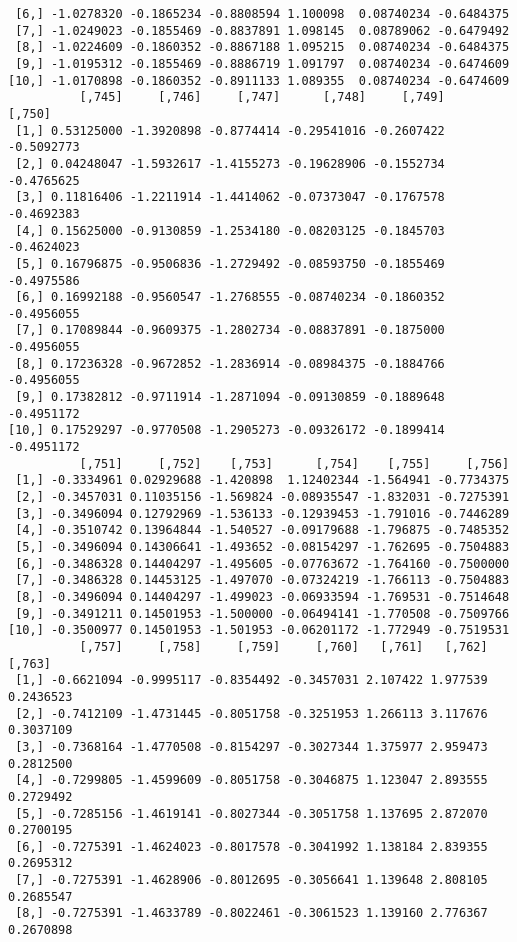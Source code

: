 \documentclass[
  letterpaper,
  DIV=11,
  numbers=noendperiod]{scrreprt}
\begin{document}
\begin{verbatim}
 [6,] -1.0278320 -0.1865234 -0.8808594 1.100098  0.08740234 -0.6484375
 [7,] -1.0249023 -0.1855469 -0.8837891 1.098145  0.08789062 -0.6479492
 [8,] -1.0224609 -0.1860352 -0.8867188 1.095215  0.08740234 -0.6484375
 [9,] -1.0195312 -0.1855469 -0.8886719 1.091797  0.08740234 -0.6474609
[10,] -1.0170898 -0.1860352 -0.8911133 1.089355  0.08740234 -0.6474609
          [,745]     [,746]     [,747]      [,748]     [,749]     [,750]
 [1,] 0.53125000 -1.3920898 -0.8774414 -0.29541016 -0.2607422 -0.5092773
 [2,] 0.04248047 -1.5932617 -1.4155273 -0.19628906 -0.1552734 -0.4765625
 [3,] 0.11816406 -1.2211914 -1.4414062 -0.07373047 -0.1767578 -0.4692383
 [4,] 0.15625000 -0.9130859 -1.2534180 -0.08203125 -0.1845703 -0.4624023
 [5,] 0.16796875 -0.9506836 -1.2729492 -0.08593750 -0.1855469 -0.4975586
 [6,] 0.16992188 -0.9560547 -1.2768555 -0.08740234 -0.1860352 -0.4956055
 [7,] 0.17089844 -0.9609375 -1.2802734 -0.08837891 -0.1875000 -0.4956055
 [8,] 0.17236328 -0.9672852 -1.2836914 -0.08984375 -0.1884766 -0.4956055
 [9,] 0.17382812 -0.9711914 -1.2871094 -0.09130859 -0.1889648 -0.4951172
[10,] 0.17529297 -0.9770508 -1.2905273 -0.09326172 -0.1899414 -0.4951172
          [,751]     [,752]    [,753]      [,754]    [,755]     [,756]
 [1,] -0.3334961 0.02929688 -1.420898  1.12402344 -1.564941 -0.7734375
 [2,] -0.3457031 0.11035156 -1.569824 -0.08935547 -1.832031 -0.7275391
 [3,] -0.3496094 0.12792969 -1.536133 -0.12939453 -1.791016 -0.7446289
 [4,] -0.3510742 0.13964844 -1.540527 -0.09179688 -1.796875 -0.7485352
 [5,] -0.3496094 0.14306641 -1.493652 -0.08154297 -1.762695 -0.7504883
 [6,] -0.3486328 0.14404297 -1.495605 -0.07763672 -1.764160 -0.7500000
 [7,] -0.3486328 0.14453125 -1.497070 -0.07324219 -1.766113 -0.7504883
 [8,] -0.3496094 0.14404297 -1.499023 -0.06933594 -1.769531 -0.7514648
 [9,] -0.3491211 0.14501953 -1.500000 -0.06494141 -1.770508 -0.7509766
[10,] -0.3500977 0.14501953 -1.501953 -0.06201172 -1.772949 -0.7519531
          [,757]     [,758]     [,759]     [,760]   [,761]   [,762]    [,763]
 [1,] -0.6621094 -0.9995117 -0.8354492 -0.3457031 2.107422 1.977539 0.2436523
 [2,] -0.7412109 -1.4731445 -0.8051758 -0.3251953 1.266113 3.117676 0.3037109
 [3,] -0.7368164 -1.4770508 -0.8154297 -0.3027344 1.375977 2.959473 0.2812500
 [4,] -0.7299805 -1.4599609 -0.8051758 -0.3046875 1.123047 2.893555 0.2729492
 [5,] -0.7285156 -1.4619141 -0.8027344 -0.3051758 1.137695 2.872070 0.2700195
 [6,] -0.7275391 -1.4624023 -0.8017578 -0.3041992 1.138184 2.839355 0.2695312
 [7,] -0.7275391 -1.4628906 -0.8012695 -0.3056641 1.139648 2.808105 0.2685547
 [8,] -0.7275391 -1.4633789 -0.8022461 -0.3061523 1.139160 2.776367 0.2670898

\end{verbatim}
\end{document}

